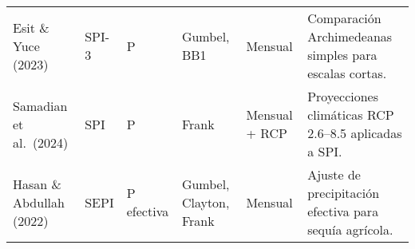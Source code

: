 \begin{landscape}
\begin{longtable}{P{3.1cm} P{2.2cm} P{3.4cm} P{2.7cm} P{2.4cm} P{6.2cm}}
Esit \& Yuce (2023) & SPI-3 & P & Gumbel, BB1 & Mensual & Comparación Archimedeanas simples para escalas cortas. \\
Samadian et al.\ (2024) & SPI & P & Frank & Mensual + RCP & Proyecciones climáticas RCP 2.6–8.5 aplicadas a SPI. \\
Hasan \& Abdullah (2022) & SEPI & P efectiva & Gumbel, Clayton, Frank & Mensual & Ajuste de precipitación efectiva para sequía agrícola. \\
\end{longtable}
\end{landscape}



